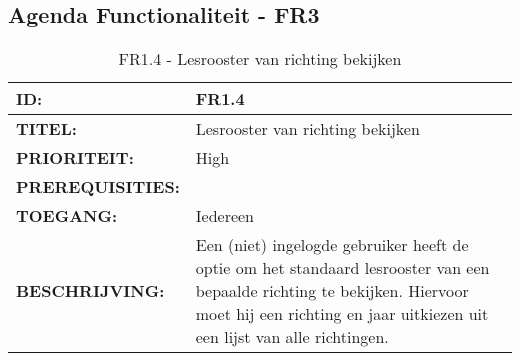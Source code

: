 \subsection{Agenda Functionaliteit - FR3}

\noindent\begin{table}[H]
            \begin{tabular}{l | p{10cm}}
                \textbf{ID:} & FR1.4 \\ \hline
                \textbf{TITEL:} & Lesrooster van richting bekijken \\ \hline
                \textbf{PRIORITEIT:} &  High \\ \hline
                \textbf{PREREQUISITIES:} & \\ \hline
                \textbf{TOEGANG:} &  Iedereen \\ \hline
                \textbf{BESCHRIJVING:} & Een (niet) ingelogde gebruiker heeft de optie om het standaard lesrooster van een bepaalde richting te bekijken. Hiervoor moet hij een richting en jaar uitkiezen uit een lijst van alle richtingen.\\
            \end{tabular}\\
            \caption{FR1.4 - Lesrooster van richting bekijken}
            \label{tab:FR1.4 - Lesrooster van richting bekijken}
        \end{table}

